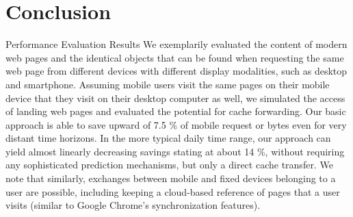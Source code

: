 \section*{Conclusion}
Performance Evaluation Results
\label{s:conc}
We exemplarily evaluated the content of modern web pages and the identical objects that can be found when requesting the same web page from different devices with different display modalities, such as desktop and smartphone.
Assuming mobile users visit the same pages on their mobile device that they visit on their desktop computer as well, we simulated the access of landing web pages and evaluated the potential for cache forwarding.
Our basic approach is able to save upward of 7.5 \% of mobile request or bytes even for very distant time horizons.
In the more typical daily time range, our approach can yield almost linearly decreasing savings stating at about 14 \%, without requiring any sophisticated prediction mechanisms, but only a direct cache transfer.
We note that similarly, exchanges between mobile and fixed devices belonging to a user are possible, including keeping a cloud-based reference of pages that a user visits (similar to Google Chrome's synchronization features).